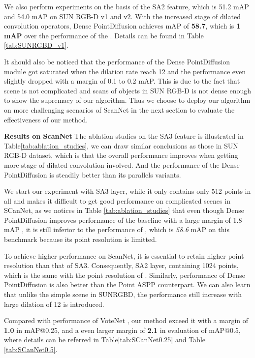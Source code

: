 \documentclass[runningheads]{llncs}
\begin{document}
We also perform experiments on the basis of the SA2 feature, which is 51.2 mAP and 54.0 mAP on SUN RGB-D v1 and v2. With the increased stage of dilated convolution operators, Dense PointDiffusion achieves mAP of \textbf{58.7}, which is \textbf{1 mAP} over the performance of the \cite{VoteNet}. Details can be found in Table \ref{tab:SUNRGBD_v1}.

It should also be noticed that the performance of the Dense PointDiffusion module got saturated when the dilation rate reach 12 and the performance even slightly dropped with a margin of 0.1 to 0.2 mAP. This is due to the fact that scene is not complicated and scans of objects in SUN RGB-D is not dense  enough to show the supremacy of our algorithm. Thus we choose to deploy our algorithm on more challenging scenarios of ScanNet \cite{SCannet} in the next section to evaluate the effectiveness of our method.

\noindent\textbf{Results on ScanNet}  The ablation studies on the SA3 feature is illustrated in Table\ref{tab:ablation_studies}, we can draw similar conclusions as those in SUN RGB-D dataset, which is that the overall performance improves when getting more stage of dilated convolution involved. And the performance of the Dense PointDiffusion is steadily better than its parallels variants.

We start our experiment with SA3 layer, while it only contains only 512 points in all and makes it difficult to get good performance on complicated scenes in SCanNet, as we notices  in Table \ref{tab:ablation_studies} that even though Dense PointDiffusion improves performance of the baseline with a large margin of 1.8 mAP , it is still inferior to the performance of \cite{VoteNet}, which is \emph{58.6} mAP on this benchmark because its point resolution is limitted.

To achieve higher performance on ScanNet\cite{SCannet}, it is essential to retain higher point resolution than that of SA3. Consequently, SA2 layer, containing 1024 points, which is the same with the point resolution of \cite{VoteNet}. Similarly, performance of Dense PointDiffusion is also better than the Point ASPP counterpart. We can also learn that unlike the simple scene in SUNRGBD\cite{SUN_RGBD}, the performance still increase with large dilation of 12 is introduced.

Compared with performance of VoteNet \cite{VoteNet}, our method exceed it with a margin of \textbf{1.0} in mAP@0.25, and a even larger margin of \textbf{2.1} in evaluation of mAP@0.5, where details can be referred in Table\ref{tab:SCanNet0.25} and Table \ref{tab:SCanNet0.5}. 
\end{document}
